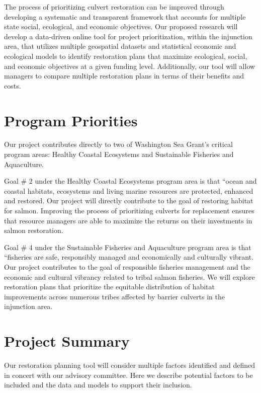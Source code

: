 \documentclass[12pt]{elsarticle}
\begin{document}
The process of prioritizing culvert restoration can be improved through developing a systematic and transparent framework that accounts for multiple state social, ecological, and economic objectives. Our proposed research will develop a data-driven online tool for project prioritization, within the injunction area, that utilizes multiple geospatial datasets and statistical economic and ecological models to identify restoration plans that maximize ecological, social, and economic objectives at a given funding level. Additionally, our tool will allow managers to compare multiple restoration plans in terms of their benefits and costs.

\section{Program Priorities}


Our project contributes directly to two of Washington Sea Grant's critical program areas: Healthy Coastal Ecosystems and Sustainable Fisheries and Aquaculture. 

Goal \# 2 under the Healthy Coastal Ecosystems program area is that ``ocean and coastal habitats, ecosystems and living marine resources are protected, enhanced and restored. Our project will directly contribute to the goal of restoring habitat for salmon. Improving the process of prioritizing culverts for replacement ensures that resource managers are able to maximize the returns on their investments in salmon restoration.

Goal \# 4 under the Sustainable Fisheries and Aquaculture program area is that ``fisheries are safe, responsibly managed and economically and culturally vibrant. Our project contributes to the goal of responsible fisheries management and the economic and cultural vibrancy related to tribal salmon fisheries. We will explore restoration plans that prioritize the equitable distribution of habitat improvements across numerous tribes affected by barrier culverts in the injunction area. 

\section{Project Summary}


Our restoration planning tool will consider multiple factors identified and defined in concert with our advisory committee. Here we describe potential factors to be included and the data and models to support their inclusion.   
\end{document}
